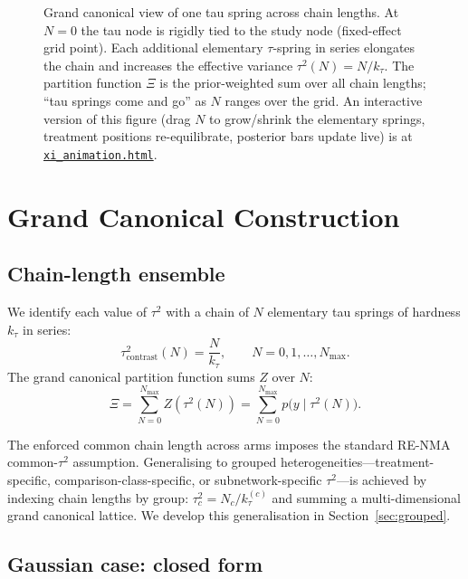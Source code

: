 \documentclass[12pt]{article}
\begin{document}
\begin{figure}[t]
\begin{tikzpicture}
\end{tikzpicture}
\caption{Grand canonical view of one tau spring across chain
lengths. At $N=0$ the tau node is rigidly tied to the study
node (fixed-effect grid point). Each additional elementary
$\tau$-spring in series elongates the chain and increases the
effective variance $\tau^2(N) = N/k_\tau$. The partition function
$\Xi$ is the prior-weighted sum over all chain lengths; ``tau
springs come and go'' as $N$ ranges over the grid. An interactive
version of this figure (drag $N$ to grow/shrink the elementary
springs, treatment positions re-equilibrate, posterior bars
update live) is at
\href{../xi_animation.html}{\texttt{xi\_animation.html}}.}
\label{fig:xi-chain}
\end{figure}

\section{Grand Canonical Construction}

\subsection{Chain-length ensemble}

We identify each value of $\tau^2$ with a chain of $N$ elementary
tau springs of hardness $k_\tau$ in series:
\begin{equation}
\tau^2_{\text{contrast}}(N) = \frac{N}{k_\tau},
\qquad N = 0, 1, \ldots, N_{\max}.
\end{equation}
The grand canonical partition function sums $Z$ over $N$:
\begin{equation}
\boxed{
\Xi = \sum_{N=0}^{N_{\max}} Z(\tau^2(N))
= \sum_{N=0}^{N_{\max}} p\bigl(y \mid \tau^2(N)\bigr).
}
\end{equation}

The enforced common chain length across arms imposes the standard
RE-NMA common-$\tau^2$ assumption. Generalising to grouped
heterogeneities---treatment-specific, comparison-class-specific, or
subnetwork-specific $\tau^2$---is achieved by indexing chain lengths
by group: $\tau^2_c = N_c / k^{(c)}_\tau$ and summing a
multi-dimensional grand canonical lattice. We develop this
generalisation in Section~\ref{sec:grouped}.

\subsection{Gaussian case: closed form}
\end{document}
